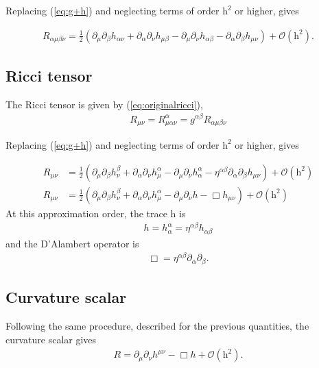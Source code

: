 Replacing (\ref{eq:g+h}) and neglecting terms of order $\text{h}^2$ or higher, gives

\begin{align}
	R_{\alpha\mu\beta\nu} = \frac{1}{2}\left(\partial_\mu\partial_\beta h_{\alpha\nu}+\partial_\alpha\partial_\nu h_{\mu\beta} - \partial_\mu\partial_\nu h_{\alpha\beta} - \partial_\alpha\partial_\beta h_{\mu\nu}\right)	 + \mathcal{O}(\text{h}^2)\label{eq:approxriemann}.
\end{align}


\subsection*{Ricci tensor}

The Ricci tensor is given by (\ref{eq:originalricci}),
\begin{align}
	R_{\mu\nu} = R^{\alpha}_{\mu\alpha\nu} = g^{\alpha\beta} R_{\alpha\mu\beta\nu} 
	\label{eq:originalricci}
\end{align}

Replacing (\ref{eq:g+h}) and neglecting terms of order $\text{h}^2$ or higher, gives

\begin{align}
	R_{\mu\nu}&= \frac{1}{2}\left(\partial_\mu\partial_\beta h^{\beta}_{\nu}+\partial_\alpha\partial_\nu h^{\alpha}_{\mu} - \partial_\mu\partial_\nu h^{\alpha}_{\alpha} - \eta^{\alpha\beta}\partial_\alpha\partial_\beta h_{\mu\nu}\right)	 + \mathcal{O}(\text{h}^2)\\
	R_{\mu\nu}&= \frac{1}{2}\left(\partial_\mu\partial_\beta h^{\beta}_{\nu}+\partial_\alpha\partial_\nu h^{\alpha}_{\mu} - \partial_\mu\partial_\nu h - \Box h_{\mu\nu}\right)	 + \mathcal{O}(\text{h}^2)
	\label{eq:approxricci}
\end{align}
At this approximation order, the trace $\text{h}$ is
\begin{align}
	h =  h^{\alpha}_{\alpha} = \eta^{\alpha\beta}h_{\alpha\beta}
\end{align}
and the D'Alambert operator is
\begin{align}
	\Box = \eta^{\alpha\beta}\partial_{\alpha}\partial_{\beta}.
	\label{eq:Dalambert}
\end{align}
 
 \subsection*{Curvature scalar}
 Following the same procedure, described for the previous quantities, the curvature scalar gives
 \begin{align}
	R = \partial_{\mu}\partial_{\nu}h^{\mu\nu} - \Box h + \mathcal{O}(\text{h}^2).
	\label{eq:curvaturescalar}
\end{align}

